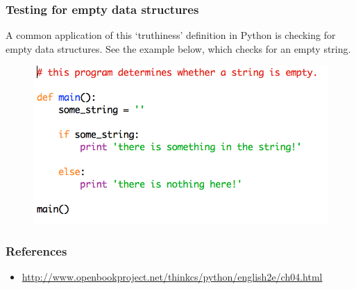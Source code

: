 \documentclass{beamer}
\begin{document}
\begin{frame}
\frametitle{Testing for empty data structures}

A common application of this `truthiness' definition in Python is checking for empty data structures. See the example below, which checks for an empty string.

\begin{figure}\centering
\includegraphics[scale=.7]{IMG/4.png}
\end{figure}
\end{frame}

\begin{frame}
\frametitle{References}

\begin{itemize}
\item
\url{http://www.openbookproject.net/thinkcs/python/english2e/ch04.html}
\end{itemize}
\end{frame}
\end{document}
